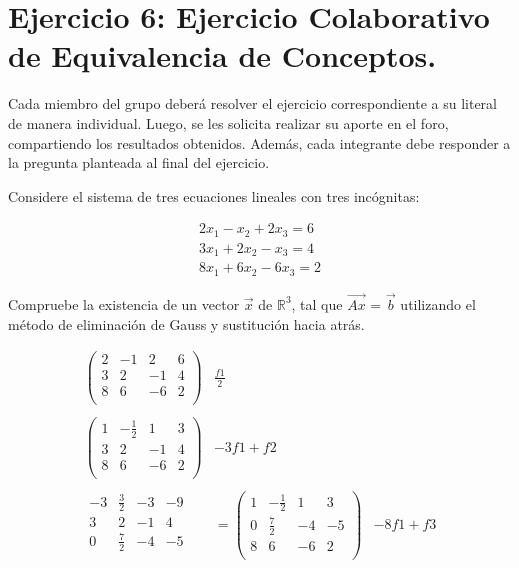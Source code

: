 
\section{\large Ejercicio 6: Ejercicio Colaborativo de Equivalencia de Conceptos.}

Cada miembro del grupo deberá resolver el ejercicio correspondiente a su literal de manera individual. Luego, se les solicita realizar su aporte en el foro, compartiendo los resultados obtenidos. Además, cada integrante debe responder a la pregunta planteada al final del ejercicio.

Considere el sistema de tres ecuaciones lineales con tres incógnitas:

\[
    \begin{array}{l}
        2x_1-x_2+2x_3=6 \\
        3x_1+2x_2-x_3=4 \\
        8x_1+6x_2-6x_3=2
    \end{array}
\]

Compruebe la existencia de un vector $\vec{x}$ de $\mathbb{R}^3$, tal que $\vec{Ax}$ = $\vec{b}$ utilizando el método de eliminación de Gauss y sustitución hacia atrás.

\[
    \begin{aligned}
        \left(
            \begin{array}{ccc|c}
                2 & -1 & 2 & 6 \\
                3 & 2 & -1 & 4 \\
                8 & 6 & -6 & 2 \\
            \end{array}
        \right) & \frac{f1}{2} \\ \\
        \left(
            \begin{array}{ccc|c}
                1 & -\frac{1}{2} & 1 & 3 \\
                3 & 2 & -1 & 4 \\
                8 & 6 & -6 & 2 \\
            \end{array}
        \right) & -3f1+f2 \\ \\
        \begin{array}{ccc|c}
            -3 & \frac{3}{2} & -3 & -9 \\
            3 & 2 & -1 & 4 \\
            \hline
            0 & \frac{7}{2} & -4 & -5 \\
        \end{array} & =
        \left(
            \begin{array}{ccc|c}
                1 & -\frac{1}{2} & 1 & 3 \\
                0 & \frac{7}{2} & -4 & -5 \\
                8 & 6 & -6 & 2 \\
            \end{array}
        \right) & -8f1+f3 \\
    \end{aligned}
\]


